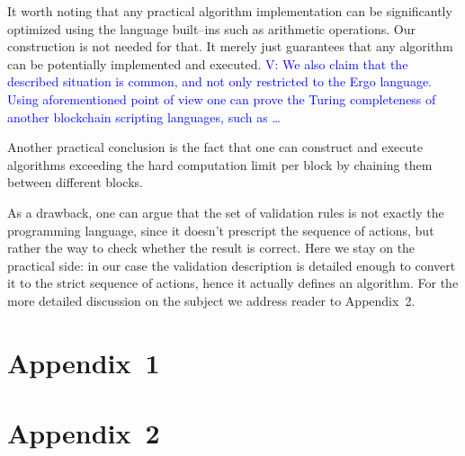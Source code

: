 \documentclass[runningheads]{llncs}
\newcommand{\vk}[1]{\textcolor{blue}{V: {#1}}}
\begin{document}
    It worth noting that any practical algorithm implementation can be
    significantly optimized using the language built--ins such as arithmetic
    operations. Our construction is not needed for that. It merely just
    guarantees that any algorithm can be potentially implemented and executed.
    \vk{We also claim that the described situation is common, and not only
    restricted to the Ergo language. Using aforementioned point of view one
    can prove the Turing completeness of another blockchain scripting
    languages, such as \ldots}

    Another practical conclusion is the fact that one can construct and execute
    algorithms exceeding the hard computation limit per block by chaining them
    between different blocks.

    As a drawback, one can argue that the set of validation rules is not exactly
    the programming language, since it doesn't prescript the sequence of actions,
    but rather the way to check whether the result is correct. Here we stay on the
    practical side: in our case the validation description is detailed enough to
    convert it to the strict sequence of actions, hence it actually defines an
    algorithm. For the more detailed discussion on the subject we address reader
    to Appendix~2.

    
    \section{Appendix~1}
    \label{appendix1}

    \section{Appendix~2}
    \label{appendix2}

\end{document}
